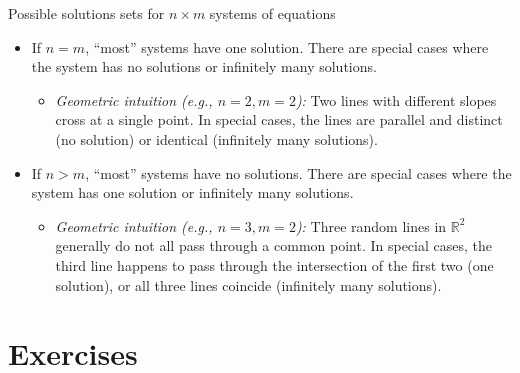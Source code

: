 \documentclass{article}
\begin{document}
\begin{activity}
\begin{calloutbox}{Possible solutions sets for \(n\times m\) systems of equations}
\begin{itemize}
\begin{itemize}
    \end{itemize}
    \item If \(n=m\), ``most'' systems have one solution. There are special cases where the system has no solutions or infinitely many solutions.
    \begin{itemize}
        \item \emph{Geometric intuition (e.g., \(n=2, m=2\)):} Two lines with different slopes cross at a single point. In special cases, the lines are parallel and distinct (no solution) or identical (infinitely many solutions).
    \end{itemize}
    \item If \(n>m\), ``most'' systems have no solutions. There are special cases where the system has one solution or infinitely many solutions.
    \begin{itemize}
        \item \emph{Geometric intuition (e.g., \(n=3, m=2\)):} Three random lines in \(\mathbb{R}^2\) generally do not all pass through a common point. In special cases, the third line happens to pass through the intersection of the first two (one solution), or all three lines coincide (infinitely many solutions).
    \end{itemize}
\end{itemize}
\end{calloutbox}
\end{activity}

\section{Exercises}\label{sec:exercises}

\end{document}
